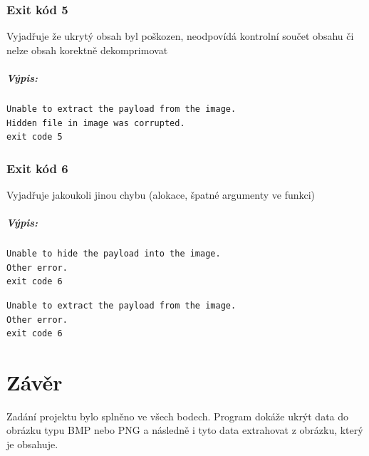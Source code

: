 \documentclass[12pt]{report}
\begin{document}
    \subsection{Exit kód 5}
    Vyjadřuje že ukrytý obsah byl poškozen, neodpovídá kontrolní součet obsahu
    či nelze obsah korektně dekomprimovat\\

    \paragraph{Výpis:}

    \begin{mdframed}
        \begin{verbatim}
Unable to extract the payload from the image.
Hidden file in image was corrupted.
exit code 5
        \end{verbatim}
    \end{mdframed}

    \subsection{Exit kód 6}
    Vyjadřuje jakoukoli jinou chybu (alokace, špatné argumenty ve funkci)\\

    \paragraph{Výpis:}

    \begin{mdframed}
        \begin{verbatim}
Unable to hide the payload into the image.
Other error.
exit code 6
        \end{verbatim}
    \end{mdframed}

        \begin{mdframed}
            \begin{verbatim}
Unable to extract the payload from the image.
Other error.
exit code 6
            \end{verbatim}
        \end{mdframed}



    \chapter{Závěr}
    Zadání projektu bylo splněno ve všech bodech. Program dokáže ukrýt data do obrázku typu BMP nebo PNG a následně i tyto data extrahovat z obrázku, který je obsahuje.
\end{document}

